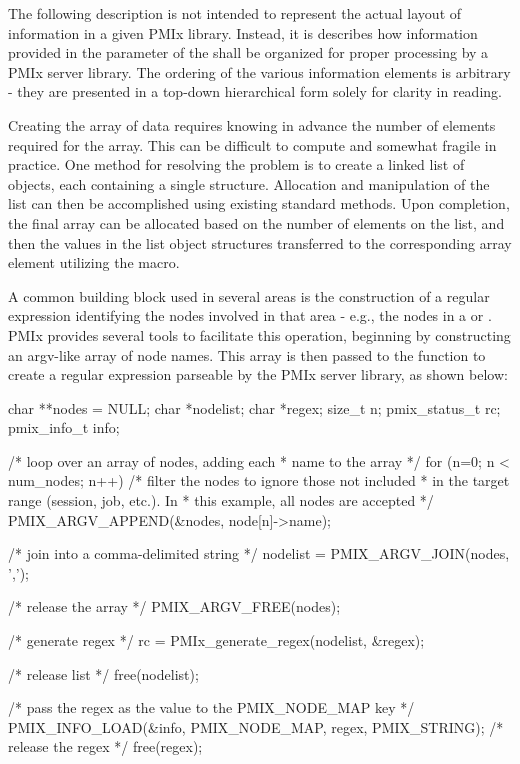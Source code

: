 The following description is not intended to represent the actual layout of information in a given \ac{PMIx} library. Instead, it is describes how information provided in the  parameter of the  shall be organized for proper processing by a \ac{PMIx} server library. The ordering of the various information elements is arbitrary - they are presented in a top-down hierarchical form solely for clarity in reading.

\advicermstart
Creating the  array of data requires knowing in advance the number of elements required for the array. This can be difficult to compute and somewhat fragile in practice. One method for resolving the problem is to create a linked list of objects, each containing a single  structure. Allocation and manipulation of the list can then be accomplished using existing standard methods. Upon completion, the final  array can be allocated based on the number of elements on the list, and then the values in the list object  structures transferred to the corresponding array element utilizing the  macro.
\advicermend

\label{cptr:api_server:noderegex}A common building block used in several areas is the construction of a regular expression identifying the nodes involved in that area - e.g., the nodes in a  or . \ac{PMIx} provides several tools to facilitate this operation, beginning by constructing an argv-like array of node names. This array is then passed to the  function to create a regular expression parseable by the \ac{PMIx} server library, as shown below:

\cspecificstart
\begin{codepar}
char **nodes = NULL;
char *nodelist;
char *regex;
size_t n;
pmix_status_t rc;
pmix_info_t info;

/* loop over an array of nodes, adding each
 * name to the array */
for (n=0; n < num_nodes; n++) {
    /* filter the nodes to ignore those not included
     * in the target range (session, job, etc.). In
     * this example, all nodes are accepted */
    PMIX_ARGV_APPEND(&nodes, node[n]->name);
}

/* join into a comma-delimited string */
nodelist = PMIX_ARGV_JOIN(nodes, ',');

/* release the array */
PMIX_ARGV_FREE(nodes);

/* generate regex */
rc = PMIx_generate_regex(nodelist, &regex);

/* release list */
free(nodelist);

/* pass the regex as the value to the PMIX_NODE_MAP key */
PMIX_INFO_LOAD(&info, PMIX_NODE_MAP, regex, PMIX_STRING);
/* release the regex */
free(regex);

\end{codepar}
\cspecificend

